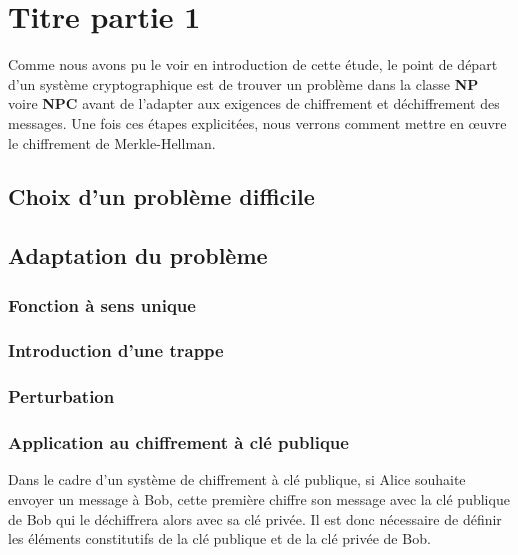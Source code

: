 \newpage

\section[Chiffrement de Merkle-Hellman]{Titre partie 1}

Comme nous avons pu le voir en introduction de cette étude, le point de départ d'un système cryptographique est de trouver un problème dans la classe \textbf{NP} voire \textbf{NPC} avant de l'adapter aux exigences de chiffrement et déchiffrement des messages. Une fois ces étapes explicitées, nous verrons comment mettre en œuvre le chiffrement de Merkle-Hellman.



\subsection{Choix d'un problème difficile}
\label{problem}





\subsection{Adaptation du problème}



\subsubsection{Fonction à sens unique}




\subsubsection{Introduction d'une trappe}
\label{trappe}



\subsubsection{Perturbation}
\label{clés}



\subsubsection{Application au chiffrement à clé publique}

Dans le cadre d'un système de chiffrement à clé publique, si Alice souhaite envoyer un message à Bob, cette première chiffre son message avec la clé publique de Bob qui le déchiffrera alors avec sa clé privée. Il est donc nécessaire de définir les éléments constitutifs de la clé publique et de la clé privée de Bob.

